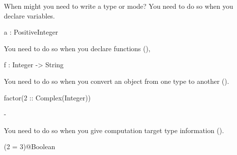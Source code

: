 \begin{xtc}
\begin{xtccomment}
When might you need to write a type or mode?
You need to do so when you declare variables.
\end{xtccomment}
\begin{spadsrc}
a : PositiveInteger
\end{spadsrc}
\end{xtc}
\begin{xtc}
\begin{xtccomment}
You need to do so when you declare functions
(),
\end{xtccomment}
\begin{spadsrc}
f : Integer -> String
\end{spadsrc}
\end{xtc}
\begin{xtc}
\begin{xtccomment}
You need to do so when you convert an object from one type to another
().
\end{xtccomment}
\begin{spadsrc}
factor(2 :: Complex(Integer))
\end{spadsrc}
\begin{TeXOutput}
\begin{fricasmath}{3}
-{\ImaginaryI \TIMES {}}%
\end{fricasmath}
\end{TeXOutput}
\end{xtc}
\begin{xtc}
\begin{xtccomment}
\end{xtccomment}
\begin{TeXOutput}
\begin{fricasmath}{4}
%
\end{fricasmath}
\end{TeXOutput}
\end{xtc}
\begin{xtc}
\begin{xtccomment}
You need to do so when you give computation target type information
().
\end{xtccomment}
\begin{spadsrc}
(2 = 3)@Boolean
\end{spadsrc}
\begin{TeXOutput}
\begin{fricasmath}{5}
%
\end{fricasmath}
\end{TeXOutput}
\end{xtc}

